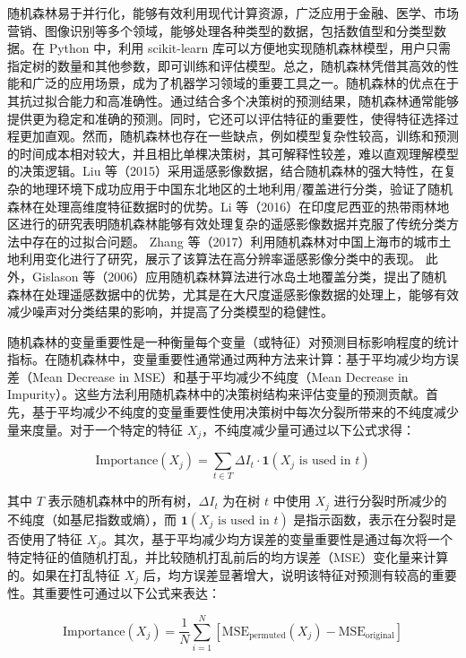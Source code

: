 \documentclass[AutoFakeBold]{LZUThesis-PgD&PhD}
\begin{document}
	随机森林易于并行化，能够有效利用现代计算资源，广泛应用于金融、医学、市场营销、图像识别等多个领域，能够处理各种类型的数据，包括数值型和分类型数据。在 Python 中，利用 scikit-learn 库可以方便地实现随机森林模型，用户只需指定树的数量和其他参数，即可训练和评估模型。总之，随机森林凭借其高效的性能和广泛的应用场景，成为了机器学习领域的重要工具之一。随机森林的优点在于其抗过拟合能力和高准确性。通过结合多个决策树的预测结果，随机森林通常能够提供更为稳定和准确的预测。同时，它还可以评估特征的重要性，使得特征选择过程更加直观。然而，随机森林也存在一些缺点，例如模型复杂性较高，训练和预测的时间成本相对较大，并且相比单棵决策树，其可解释性较差，难以直观理解模型的决策逻辑。Liu 等（2015）采用遥感影像数据，结合随机森林的强大特性，在复杂的地理环境下成功应用于中国东北地区的土地利用/覆盖进行分类，验证了随机森林在处理高维度特征数据时的优势\cite{liu2015}。Li 等（2016）在印度尼西亚的热带雨林地区进行的研究表明随机森林能够有效处理复杂的遥感影像数据并克服了传统分类方法中存在的过拟合问题\cite{li2016}。
	Zhang 等（2017）利用随机森林对中国上海市的城市土地利用变化进行了研究，展示了该算法在高分辨率遥感影像分类中的表现\cite{zhang2017}。
	此外，Gislason 等（2006）应用随机森林算法进行冰岛土地覆盖分类，提出了随机森林在处理遥感数据中的优势，尤其是在大尺度遥感影像数据的处理上，能够有效减少噪声对分类结果的影响，并提高了分类模型的稳健性\cite{gislason2006}。
	
	随机森林的变量重要性是一种衡量每个变量（或特征）对预测目标影响程度的统计指标。在随机森林中，变量重要性通常通过两种方法来计算：基于平均减少均方误差（Mean Decrease in MSE）和基于平均减少不纯度（Mean Decrease in Impurity）。这些方法利用随机森林中的决策树结构来评估变量的预测贡献。首先，基于平均减少不纯度的变量重要性使用决策树中每次分裂所带来的不纯度减少量来度量。对于一个特定的特征 \( X_j \)，不纯度减少量可通过以下公式求得：
	
	\[
	\text{Importance}(X_j) = \sum_{t \in T} \Delta I_t \cdot \mathbf{1}(X_j \text{ is used in } t)
	\]
	
	其中 \( T \) 表示随机森林中的所有树，\( \Delta I_t \) 为在树 \( t \) 中使用 \( X_j \) 进行分裂时所减少的不纯度（如基尼指数或熵），而 \( \mathbf{1}(X_j \text{ is used in } t) \) 是指示函数，表示在分裂时是否使用了特征 \( X_j\)。其次，基于平均减少均方误差的变量重要性是通过每次将一个特定特征的值随机打乱，并比较随机打乱前后的均方误差（MSE）变化量来计算的。如果在打乱特征 \( X_j \) 后，均方误差显著增大，说明该特征对预测有较高的重要性。其重要性可通过以下公式来表达：
	
	\[
	\text{Importance}(X_j) = \frac{1}{N} \sum_{i=1}^{N} \left[ \text{MSE}_{\text{permuted}}(X_j) - \text{MSE}_{\text{original}} \right]
	\]
	
\end{document}
